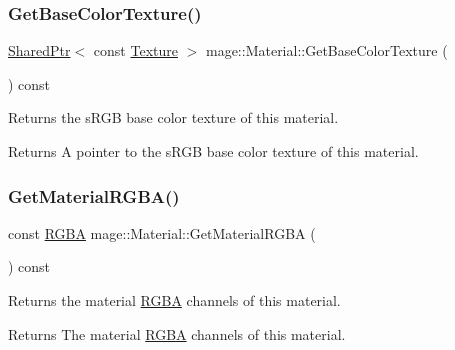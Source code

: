 \subsubsection{\texorpdfstring{Get\+Base\+Color\+Texture()}{GetBaseColorTexture()}}
{\footnotesize\ttfamily \hyperlink{namespacemage_a1e01ae66713838a7a67d30e44c67703e}{Shared\+Ptr}$<$ const \hyperlink{classmage_1_1_texture}{Texture} $>$ mage\+::\+Material\+::\+Get\+Base\+Color\+Texture (\begin{DoxyParamCaption}{ }\end{DoxyParamCaption}) const\hspace{0.3cm}{\ttfamily [noexcept]}}

Returns the s\+R\+GB base color texture of this material.

\begin{DoxyReturn}{Returns}
A pointer to the s\+R\+GB base color texture of this material. 
\end{DoxyReturn}
\hypertarget{classmage_1_1_material_a58b1f3d253b1a6d8541bc9a954e6fc1d}{}\label{classmage_1_1_material_a58b1f3d253b1a6d8541bc9a954e6fc1d} 
\subsubsection{\texorpdfstring{Get\+Material\+R\+G\+B\+A()}{GetMaterialRGBA()}}
{\footnotesize\ttfamily const \hyperlink{structmage_1_1_r_g_b_a}{R\+G\+BA} mage\+::\+Material\+::\+Get\+Material\+R\+G\+BA (\begin{DoxyParamCaption}{ }\end{DoxyParamCaption}) const\hspace{0.3cm}{\ttfamily [noexcept]}}

Returns the material \hyperlink{structmage_1_1_r_g_b_a}{R\+G\+BA} channels of this material.

\begin{DoxyReturn}{Returns}
The material \hyperlink{structmage_1_1_r_g_b_a}{R\+G\+BA} channels of this material. 
\end{DoxyReturn}
\hypertarget{classmage_1_1_material_a0675c4bbbdb48c0db9bf82fffb073094}{}\label{classmage_1_1_material_a0675c4bbbdb48c0db9bf82fffb073094} 
